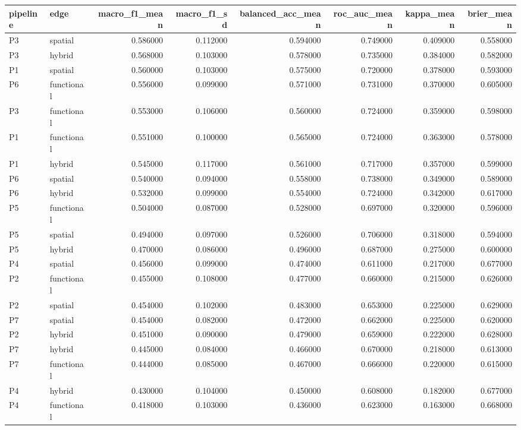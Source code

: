 \begin{tabular}{llrrrrrr}
\toprule
pipeline & edge & macro_f1_mean & macro_f1_sd & balanced_acc_mean & roc_auc_mean & kappa_mean & brier_mean \\
\midrule
P3 & spatial & 0.586000 & 0.112000 & 0.594000 & 0.749000 & 0.409000 & 0.558000 \\
P3 & hybrid & 0.568000 & 0.103000 & 0.578000 & 0.735000 & 0.384000 & 0.582000 \\
P1 & spatial & 0.560000 & 0.103000 & 0.575000 & 0.720000 & 0.378000 & 0.593000 \\
P6 & functional & 0.556000 & 0.099000 & 0.571000 & 0.731000 & 0.370000 & 0.605000 \\
P3 & functional & 0.553000 & 0.106000 & 0.560000 & 0.724000 & 0.359000 & 0.598000 \\
P1 & functional & 0.551000 & 0.100000 & 0.565000 & 0.724000 & 0.363000 & 0.578000 \\
P1 & hybrid & 0.545000 & 0.117000 & 0.561000 & 0.717000 & 0.357000 & 0.599000 \\
P6 & spatial & 0.540000 & 0.094000 & 0.558000 & 0.738000 & 0.349000 & 0.589000 \\
P6 & hybrid & 0.532000 & 0.099000 & 0.554000 & 0.724000 & 0.342000 & 0.617000 \\
P5 & functional & 0.504000 & 0.087000 & 0.528000 & 0.697000 & 0.320000 & 0.596000 \\
P5 & spatial & 0.494000 & 0.097000 & 0.526000 & 0.706000 & 0.318000 & 0.594000 \\
P5 & hybrid & 0.470000 & 0.086000 & 0.496000 & 0.687000 & 0.275000 & 0.600000 \\
P4 & spatial & 0.456000 & 0.099000 & 0.474000 & 0.611000 & 0.217000 & 0.677000 \\
P2 & functional & 0.455000 & 0.108000 & 0.477000 & 0.660000 & 0.215000 & 0.626000 \\
P2 & spatial & 0.454000 & 0.102000 & 0.483000 & 0.653000 & 0.225000 & 0.629000 \\
P7 & spatial & 0.454000 & 0.082000 & 0.472000 & 0.662000 & 0.225000 & 0.620000 \\
P2 & hybrid & 0.451000 & 0.090000 & 0.479000 & 0.659000 & 0.222000 & 0.628000 \\
P7 & hybrid & 0.445000 & 0.084000 & 0.466000 & 0.670000 & 0.218000 & 0.613000 \\
P7 & functional & 0.444000 & 0.085000 & 0.467000 & 0.666000 & 0.220000 & 0.615000 \\
P4 & hybrid & 0.430000 & 0.104000 & 0.450000 & 0.608000 & 0.182000 & 0.677000 \\
P4 & functional & 0.418000 & 0.103000 & 0.436000 & 0.623000 & 0.163000 & 0.668000 \\
\bottomrule
\end{tabular}
